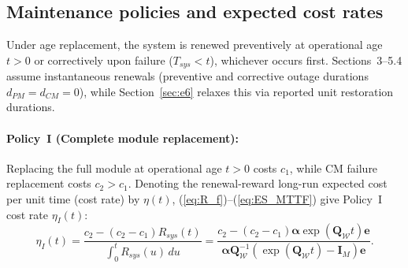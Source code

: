 \documentclass{elektr}
\begin{document}
\subsection{Maintenance policies and expected cost rates}
Under age replacement, the system is renewed preventively at operational age $t > 0$ or correctively upon failure ($T_{sys} < t$), whichever occurs first. Sections~3--5.4 assume instantaneous renewals (preventive and corrective outage durations $d_{PM} = d_{CM} = 0$), while Section~\ref{sec:e6} relaxes this via reported unit restoration durations.

\paragraph{Policy~I (Complete module replacement):} Replacing the full module at operational age $t > 0$ costs $c_1$, while CM failure replacement costs $c_2 > c_1$. Denoting the renewal-reward long-run expected cost per unit time (cost rate) by $\eta(t)$, (\ref{eq:R_f})--(\ref{eq:ES_MTTF}) give Policy~I cost rate $\eta_I(t)$:
\begin{equation}
\eta_I(t) = \frac{c_2 - (c_2 - c_1) R_{sys}(t)}{\int_{0}^{t} R_{sys}(u)\,du} = \frac{c_2 - (c_2 - c_1) \boldsymbol{\alpha} \exp(\mathbf{Q}_{\mathcal{W}} t) \mathbf{e}}{\boldsymbol{\alpha} \mathbf{Q}_{\mathcal{W}}^{-1} \left( \exp(\mathbf{Q}_{\mathcal{W}} t) - \mathbf{I}_M \right) \mathbf{e}}.
\label{eq:etaI}
\end{equation}
\end{document}
